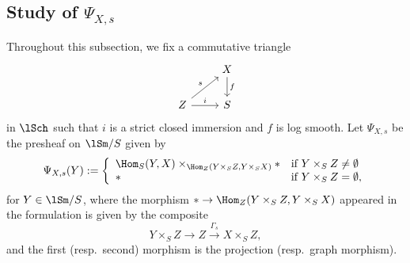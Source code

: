 \documentclass[10pt]{amsart}
\begin{document}
\subsection{Study of \texorpdfstring{$\Psi_{X,s}$}{PsiXs}}
\label{study}
Throughout this subsection, we fix a commutative triangle
\[
\begin{tikzcd}
&X\ar[d,"f"]
\\
Z\ar[ru,"s"]\ar[r,"i"]&
S
\end{tikzcd}
\]
in $\lSch$ such that $i$ is a strict closed immersion and $f$ is log smooth.
Let $\Psi_{X,s}$ be the presheaf on $\lSm/S$ given by
\[
\Psi_{X,s}(Y)
:=
\left\{
\begin{array}{ll}
\Hom_S(Y,X)\times_{\Hom_Z(Y\times_S Z,Y\times_S X)}*&\text{if }Y\times_S Z\neq \emptyset
\\
* &\text{if }Y\times_S Z= \emptyset,
\end{array}
\right.
\]
for $Y\in \lSm/S$, where the morphism $*\to \Hom_Z(Y\times_S Z,Y\times_S X)$ appeared in the formulation is given by the composite
\[
Y\times_S Z \to Z \xrightarrow{\Gamma_s} X\times_S Z,
\]
and the first (resp.\ second) morphism is the projection (resp.\ graph morphism).
\end{document}
